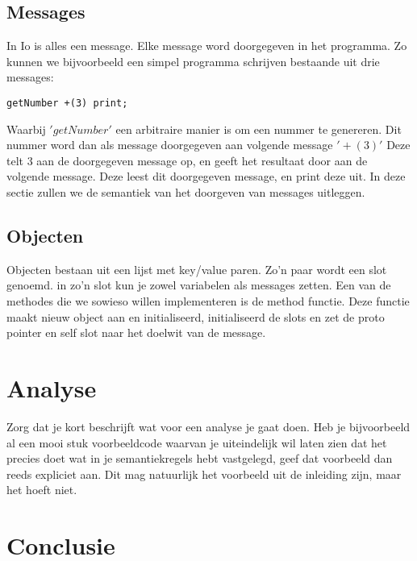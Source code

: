 \documentclass[12pt]{article}
\begin{document}
\subsection{Messages}
In Io is alles een message. Elke message word doorgegeven in het programma. Zo kunnen we bijvoorbeeld een simpel programma schrijven bestaande uit drie messages:
\begin{lstlisting}[frame=single]
getNumber +(3) print;
\end{lstlisting}
Waarbij \('getNumber'\) een arbitraire manier is om een nummer te genereren. Dit nummer word dan als message doorgegeven aan volgende message \('+(3)'\) Deze telt \(3\) aan de doorgegeven message op, en geeft het resultaat door aan de volgende message. Deze leest dit doorgegeven message, en print deze uit.
In deze sectie zullen we de semantiek van het doorgeven van messages uitleggen.

\subsection{Objecten}
Objecten bestaan uit een lijst met key/value paren. Zo'n paar wordt een slot genoemd.
in zo'n slot kun je zowel variabelen als messages zetten.
Een van de methodes die we sowieso willen implementeren is de method functie. 
Deze functie maakt nieuw object aan en initialiseerd, initialiseerd de slots en zet de proto pointer en self slot naar het doelwit van de message. 

\section{Analyse}
Zorg dat je kort beschrijft wat voor een analyse je gaat doen. Heb je bijvoorbeeld al een mooi stuk voorbeeldcode waarvan je uiteindelijk wil laten zien dat het precies doet wat in je semantiekregels hebt vastgelegd, geef dat voorbeeld dan reeds expliciet aan. Dit mag natuurlijk het voorbeeld uit de inleiding zijn, maar het hoeft niet.

\section{Conclusie}

\appendix
\end{document}
